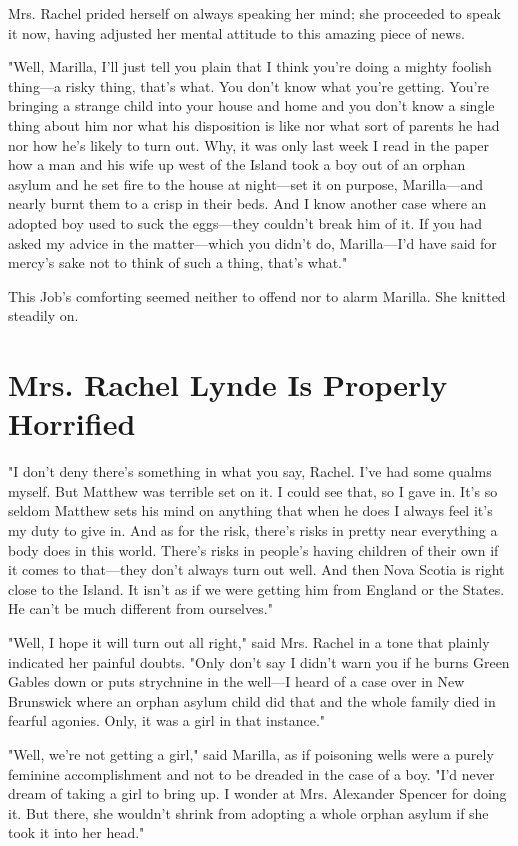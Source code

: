 \documentclass{article}
\begin{document}
Mrs. Rachel prided herself on always speaking her mind; she proceeded to speak it now, having adjusted her mental attitude to this amazing piece of news.

"Well, Marilla, I'll just tell you plain that I think you're doing a mighty foolish thing---a risky thing, that's what. You don't know what you're getting. You're bringing a strange child into your house and home and you don't know a single thing about him nor what his disposition is like nor what sort of parents he had nor how he's likely to turn out. Why, it was only last week I read in the paper how a man and his wife up west of the Island took a boy out of an orphan asylum and he set fire to the house at night---set it on purpose, Marilla---and nearly burnt them to a crisp in their beds. And I know another case where an adopted boy used to suck the eggs---they couldn't break him of it. If you had asked my advice in the matter---which you didn't do, Marilla---I'd have said for mercy's sake not to think of such a thing, that's what."

This Job's comforting seemed neither to offend nor to alarm Marilla. She knitted steadily on.

\section{Mrs. Rachel Lynde Is Properly Horrified}
"I don't deny there's something in what you say, Rachel. I've had some qualms myself. But Matthew was terrible set on it. I could see that, so I gave in. It's so seldom Matthew sets his mind on anything that when he does I always feel it's my duty to give in. And as for the risk, there's risks in pretty near everything a body does in this world. There's risks in people's having children of their own if it comes to that---they don't always turn out well. And then Nova Scotia is right close to the Island. It isn't as if we were getting him from England or the States. He can't be much different from ourselves."

"Well, I hope it will turn out all right," said Mrs. Rachel in a tone that plainly indicated her painful doubts. "Only don't say I didn't warn you if he burns Green Gables down or puts strychnine in the well---I heard of a case over in New Brunswick where an orphan asylum child did that and the whole family died in fearful agonies. Only, it was a girl in that instance."

"Well, we're not getting a girl," said Marilla, as if poisoning wells were a purely feminine accomplishment and not to be dreaded in the case of a boy. "I'd never dream of taking a girl to bring up. I wonder at Mrs. Alexander Spencer for doing it. But there, she wouldn't shrink from adopting a whole orphan asylum if she took it into her head."
\end{document}
